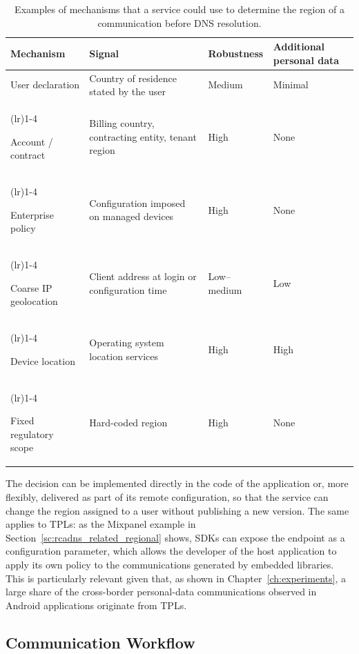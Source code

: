 \documentclass[
A4paper,                %
twoside,                %
openright,              %
chapterprefix=true,     %
12pt,                   %
headings=normal,        %
titlepage=on            %
]{book}
\newcommand{\rowsep}[1]{%
    \arrayrulecolor{black!30}%
    \cmidrule[0.3pt](lr){1-#1}%
    \arrayrulecolor{black}%
}
\begin{document}
\begin{table}[ht]
    \centering
    \small
    \caption{Examples of mechanisms that a service could use to determine the region of a communication before DNS resolution.}
    \label{tab:rcadns_region_mechanisms}
    \begin{tabularx}{\textwidth}{>{\raggedright\arraybackslash}p{3.3cm} >{\raggedright\arraybackslash}X >{\raggedright\arraybackslash}p{2.0cm} >{\raggedright\arraybackslash}p{2.3cm}}
        \toprule
        \textbf{Mechanism} & \textbf{Signal} & \textbf{Robustness} & \textbf{Additional personal data} \\
        \midrule
        User declaration & Country of residence stated by the user & Medium & Minimal \\
        \rowsep{4}
        Account / contract & Billing country, contracting entity, tenant region & High & None \\
        \rowsep{4}
        Enterprise policy & Configuration imposed on managed devices & High & None \\
        \rowsep{4}
        Coarse IP geolocation & Client address at login or configuration time & Low--medium & Low \\
        \rowsep{4}
        Device location & Operating system location services & High & High \\
        \rowsep{4}
        Fixed regulatory scope & Hard-coded region & High & None \\
        \bottomrule
    \end{tabularx}
\end{table}

The decision can be implemented directly in the code of the application or, more flexibly, delivered as part of its remote configuration, so that the service can change the region assigned to a user without publishing a new version. The same applies to TPLs: as the Mixpanel example in Section~\ref{sc:rcadns_related_regional} shows, SDKs can expose the endpoint as a configuration parameter, which allows the developer of the host application to apply its own policy to the communications generated by embedded libraries. This is particularly relevant given that, as shown in Chapter~\ref{ch:experiments}, a large share of the cross-border personal-data communications observed in Android applications originate from TPLs.

\subsection{Communication Workflow}
\label{sc:rcadns_workflow}
\end{document}
